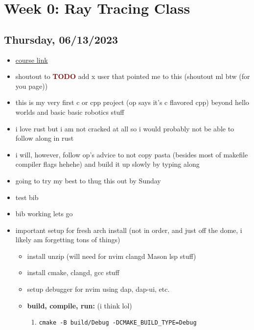 \clearpage
\section{Week 0: Ray Tracing Class}

\subsection*{Thursday, 06/13/2023}
\begin{itemize}
    \item \textcolor{DarkGreen}{\href{https://raytracing.github.io/books/RayTracingInOneWeekend.html}{course link}}
    \item shoutout to \textbf{\textcolor{Maroon}{TODO}} add x user that pointed
        me to this (shoutout ml btw (for you page))
    \item this is my very first c or cpp project (op says it's c flavored cpp) 
        beyond hello worlds and basic basic robotics stuff
    \item i love rust but i am not cracked at all so i would probably not be
        able to follow along in rust
    \item i will, however, follow op's advice to not copy pasta (besides most of 
        makefile compiler flags hehehe) and build it up slowly by typing along
    \item going to try my best to thug this out by Sunday
    \item test bib \cite{Shirley2024RTW1}
    \item bib working lets go
    \item important setup for fresh arch install (not in order, and just off the
        dome, i likely am forgetting tons of things)
        \begin{itemize}
            \item install unzip (will need for nvim clangd Mason lsp stuff)
            \item install cmake, clangd, gcc stuff
            \item setup debugger for nvim using dap, dap-ui, etc. 
            \item \textbf{build, compile, run:} (i think lol)
                \begin{enumerate}
                    \item \texttt{cmake -B build/Debug -DCMAKE_BUILD_TYPE=Debug} 

\end{enumerate}
\end{itemize}
\end{itemize}
